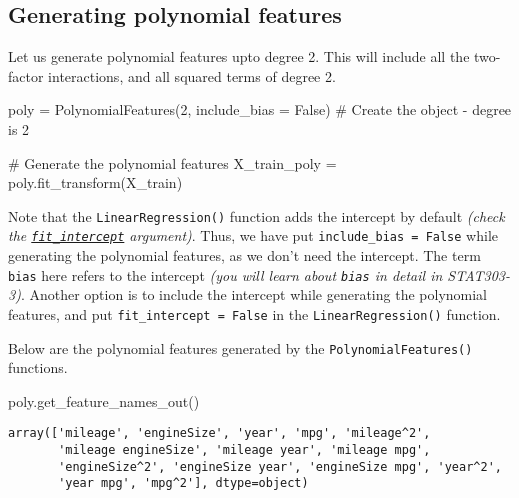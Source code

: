 \documentclass[
  letterpaper,
  DIV=11,
  numbers=noendperiod]{scrreprt}
\newenvironment{Shaded}{\begin{snugshade}}{\end{snugshade}}
\newcommand{\CommentTok}[1]{\textcolor[rgb]{0.37,0.37,0.37}{#1}}
\newcommand{\DecValTok}[1]{\textcolor[rgb]{0.68,0.00,0.00}{#1}}
\newcommand{\NormalTok}[1]{\textcolor[rgb]{0.00,0.23,0.31}{#1}}
\newcommand{\OperatorTok}[1]{\textcolor[rgb]{0.37,0.37,0.37}{#1}}
\newcommand{\VariableTok}[1]{\textcolor[rgb]{0.07,0.07,0.07}{#1}}
\begin{document}
\subsection{Generating polynomial
features}\label{generating-polynomial-features}

Let us generate polynomial features upto degree 2. This will include all
the two-factor interactions, and all squared terms of degree 2.

\begin{Shaded}
\begin{Highlighting}[]
\NormalTok{poly }\OperatorTok{=}\NormalTok{ PolynomialFeatures(}\DecValTok{2}\NormalTok{, include\_bias }\OperatorTok{=} \VariableTok{False}\NormalTok{) }\CommentTok{\# Create the object {-} degree is 2}

\CommentTok{\# Generate the polynomial features}
\NormalTok{X\_train\_poly }\OperatorTok{=}\NormalTok{ poly.fit\_transform(X\_train) }
\end{Highlighting}
\end{Shaded}

Note that the \texttt{LinearRegression()} function adds the intercept by
default \emph{(check the
\href{https://scikit-learn.org/stable/modules/generated/sklearn.linear_model.LinearRegression.html}{\texttt{fit\_intercept}}
argument)}. Thus, we have put \texttt{include\_bias\ =\ False} while
generating the polynomial features, as we don't need the intercept. The
term \texttt{bias} here refers to the intercept \emph{(you will learn
about \texttt{bias} in detail in STAT303-3)}. Another option is to
include the intercept while generating the polynomial features, and put
\texttt{fit\_intercept\ =\ False} in the \texttt{LinearRegression()}
function.

Below are the polynomial features generated by the
\texttt{PolynomialFeatures()} functions.

\begin{Shaded}
\begin{Highlighting}[]
\NormalTok{poly.get\_feature\_names\_out()}
\end{Highlighting}
\end{Shaded}

\begin{verbatim}
array(['mileage', 'engineSize', 'year', 'mpg', 'mileage^2',
       'mileage engineSize', 'mileage year', 'mileage mpg',
       'engineSize^2', 'engineSize year', 'engineSize mpg', 'year^2',
       'year mpg', 'mpg^2'], dtype=object)
\end{verbatim}
\end{document}
